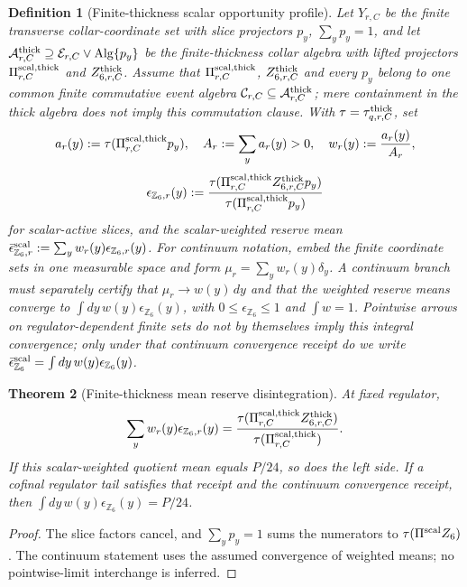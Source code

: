 \documentclass[11pt]{article}
\newtheorem{theorem}{Theorem}[section]
\newtheorem{definition}[theorem]{Definition}
\theoremstyle{remark}
\theoremstyle{plain}
\begin{document}
\begin{definition}[Finite-thickness scalar opportunity profile]
\label{def:finite-thickness-scalar-profile}
Let \(Y_{r,C}\) be the finite transverse collar-coordinate set with slice
projectors \(p_y\), \(\sum_yp_y=1\), and let
\(\mathcal A^{\rm thick}_{r,C}\supseteq\mathcal E_{r,C}\vee
\operatorname{Alg}\{p_y\}\) be the finite-thickness collar algebra with lifted
projectors \(\Pi^{\rm scal,thick}_{r,C}\) and \(Z^{\rm thick}_{6,r,C}\).
Assume that \(\Pi^{\rm scal,thick}_{r,C}\), \(Z^{\rm thick}_{6,r,C}\) and every
\(p_y\) belong to one common finite commutative event algebra
\(\mathcal C_{r,C}\subseteq\mathcal A^{\rm thick}_{r,C}\); mere containment in
the thick algebra does not imply this commutation clause. With
\(\tau=\tau^{\rm thick}_{q,r,C}\), set
\[
a_r(y):=\tau(\Pi^{\rm scal,thick}_{r,C}p_y),\quad
A_r:=\sum_ya_r(y)>0,\quad
w_r(y):=\frac{a_r(y)}{A_r},
\]
\[
\epsilon_{\mathbb Z_6,r}(y):=
\frac{\tau(\Pi^{\rm scal,thick}_{r,C}Z^{\rm thick}_{6,r,C}p_y)}
{\tau(\Pi^{\rm scal,thick}_{r,C}p_y)}
\]
for scalar-active slices, and the scalar-weighted reserve mean
\(\bar\epsilon_{\mathbb Z_6,r}^{\rm scal}:=\sum_yw_r(y)\epsilon_{\mathbb Z_6,r}(y)\).
For continuum notation, embed the finite coordinate sets in one measurable
space and form \(\mu_r=\sum_yw_r(y)\delta_y\). A continuum branch must
separately certify that \(\mu_r\to w(y)\,dy\) and that the weighted reserve
means converge to \(\int dy\,w(y)\epsilon_{\mathbb Z_6}(y)\), with
\(0\le\epsilon_{\mathbb Z_6}\le1\) and \(\int w=1\). Pointwise arrows on
regulator-dependent finite sets do not by themselves imply this integral
convergence; only under that continuum convergence receipt do we write
\(\bar\epsilon_{\mathbb Z_6}^{\rm scal}=\int dy\,w(y)\epsilon_{\mathbb Z_6}(y)\).
\end{definition}

\begin{theorem}[Finite-thickness mean reserve disintegration]
\label{thm:finite-thickness-mean-reserve}
At fixed regulator,
\[
\sum_yw_r(y)\epsilon_{\mathbb Z_6,r}(y)=
\frac{\tau(\Pi^{\rm scal,thick}_{r,C}Z^{\rm thick}_{6,r,C})}
{\tau(\Pi^{\rm scal,thick}_{r,C})}.
\]
If this scalar-weighted quotient mean equals \(P/24\), so does the left side.
If a cofinal regulator tail satisfies that receipt and the continuum
convergence receipt, then \(\int dy\,w(y)\epsilon_{\mathbb Z_6}(y)=P/24\).
\end{theorem}

\begin{proof}
The slice factors cancel, and \(\sum_yp_y=1\) sums the numerators to
\(\tau(\Pi^{\rm scal}Z_6)\). The continuum statement uses the assumed
convergence of weighted means; no pointwise-limit interchange is inferred.
\end{proof}
\end{document}
